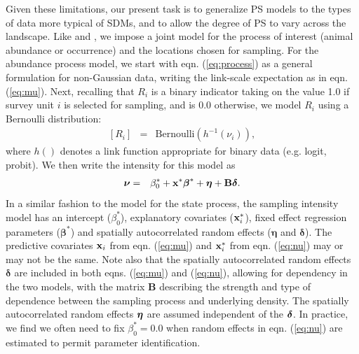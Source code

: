 \documentclass[times,mee,doublespace,]{besauth2}
\begin{document}
Given these limitations, our present task is to generalize PS models to the types of data more typical of SDMs, and to allow the degree of PS to vary across the landscape.  Like \citet{DiggleEtAl2010} and \citet{PatiEtAl2011}, we impose a joint model for the process of interest (animal abundance or occurrence) and the locations chosen for sampling. For the abundance process model, we start with eqn. (\ref{eq:process}) as a general formulation for non-Gaussian data, writing the link-scale expectation as in eqn. (\ref{eq:mu}).
Next, recalling that $R_i$ is a binary indicator taking on the value 1.0 if survey unit $i$ is selected for sampling, and is 0.0 otherwise, we model $R_i$ using a Bernoulli distribution:
\begin{eqnarray}
 \label{eq:R}
  [R_i] & = & \text{Bernoulli}(h^{-1}(\nu_i)),
\end{eqnarray}
where $h()$ denotes a link function appropriate for binary data (e.g. logit, probit).  We then write the intensity for this model as
\begin{eqnarray}
  \label{eq:nu}
  \boldsymbol{\nu} & = & \beta_0^* + {\bf x}^* \boldsymbol{\beta}^*+\boldsymbol{\eta}+{\bf B} \boldsymbol{\delta}.
\label{eq:nu}
\end{eqnarray}
 In a similar fashion to the model for the state process, the sampling intensity model has an intercept ($\beta_0^*$), explanatory covariates (${\bf x}_i^*$), fixed effect regression parameters ($\boldsymbol{\beta}^*$) and spatially autocorrelated random effects ($\boldsymbol{\eta}$ and $\boldsymbol{\delta}$).  The predictive covariates ${\bf x}_i$ from eqn. (\ref{eq:mu}) and ${\bf x}_i^*$ from eqn. (\ref{eq:nu}) may or may not be the same.  Note also that the  spatially autocorrelated random effects $\boldsymbol{\delta}$ are included in both eqns. (\ref{eq:mu}) and (\ref{eq:nu}), allowing for dependency in the two models, with the matrix {\bf B} describing the strength and type of dependence between the sampling process and underlying density.  The spatially autocorrelated random effects $\boldsymbol{\eta}$ are assumed independent of the $\boldsymbol{\delta}$.  In practice, we find we often need to fix $\beta_0^*=0.0$ when random effects in eqn. (\ref{eq:nu}) are estimated to permit parameter identification.
\end{document}
